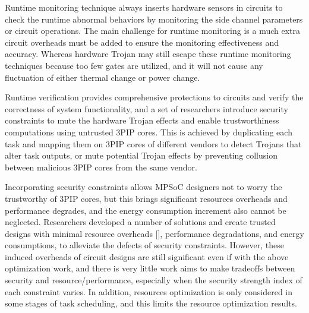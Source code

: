 \documentclass[10pt,journal]{IEEEtran}
\begin{document}


Runtime monitoring technique always inserts hardware sensors in circuits to check the runtime abnormal behaviors by monitoring the side channel parameters or circuit operations. The main challenge for runtime monitoring is a much extra circuit overheads must be added to ensure the monitoring effectiveness and accuracy. Whereas hardware Trojan may still escape these runtime monitoring techniques because too few gates are utilized, and it will not cause any fluctuation of either thermal change or power change.

Runtime verification provides comprehensive protections to circuits and verify the correctness of system functionality, and a set of researchers introduce security constraints to mute the hardware Trojan effects and enable trustworthiness computations using untrusted 3PIP cores. This is achieved by duplicating each task and mapping them on 3PIP cores of different vendors to detect Trojans that alter task outputs, or mute potential Trojan effects by preventing collusion between malicious 3PIP cores from the same vendor.

Incorporating security constraints allows MPSoC designers not to worry the trustworthy of 3PIP cores, but this brings significant resources overheads and performance degrades, and the energy consumption increment also cannot be neglected. Researchers developed a number of solutions and create trusted designs with minimal resource overheads [], performance degradations, and energy consumptions, to alleviate the defects of security constraints. However, these induced overheads of circuit designs are still significant even if with the above optimization work, and there is very little work aims to make tradeoffs between security and resource/performance, especially when the security strength index of each constraint varies. In addition, resources optimization is only considered in some stages of task scheduling, and this limits the resource optimization results.
\end{document}

